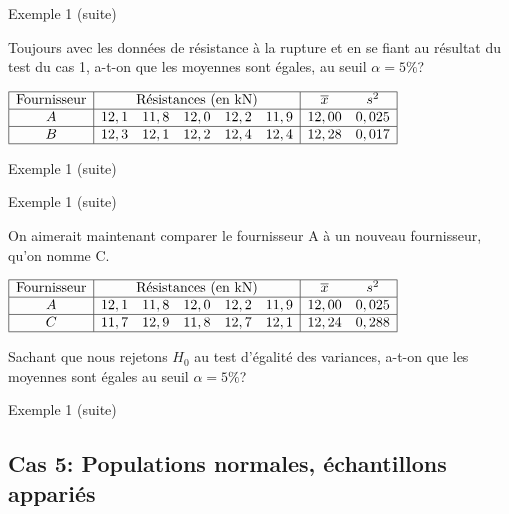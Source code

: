 \documentclass{BeamerTemplate}
\begin{document}
\begin{frame}[t]{Exemple 1 (suite)}

{\small
Toujours avec les données de résistance à la rupture et en se fiant au résultat du test du cas 1, a-t-on que les moyennes sont égales, au seuil $\alpha=5\%$?

\vspace{0.5cm}
$\begin{array}{|c|lllll|cc|}\hline
\text{Fournisseur} &\multicolumn{5}{c|}{\text{Résistances (en kN)}}&\overline x&s^2\\\hline
A &12,1 & 11,8 & 12,0 & 12,2 & 11,9&12,00 &0,025 \\ \hline
B &12,3 & 12,1 & 12,2 & 12,4 &12,4& 12,28&0,017 \\
\hline
\end{array}$

}


\end{frame}


\begin{frame}[t]{Exemple 1 (suite)}



\end{frame}
\begin{frame}[t]{Exemple 1 (suite)}
\small{
On aimerait maintenant comparer le fournisseur A à un nouveau fournisseur, qu'on nomme C. 

\vspace{0.5cm}
$\begin{array}{|c|lllll|cc|}\hline
\text{Fournisseur} &\multicolumn{5}{c|}{\text{Résistances (en kN)}}&\overline x&s^2\\\hline
A &12,1 & 11,8 & 12,0 & 12,2 & 11,9&12,00 &0,025 \\ \hline
C &11,7 & 12,9 & 11,8 & 12,7 &12,1& 12,24&0,288 \\
\hline
\end{array}$

Sachant que nous rejetons $H_0$ au test d'égalité des variances, a-t-on que les moyennes sont égales au seuil $\alpha=5\%$?} 

\end{frame}

\begin{frame}[t]{Exemple 1 (suite)}
    
\end{frame}
\subsection{Cas 5: Populations normales, échantillons appariés}\label{sec:ttestapp}
\end{document}
